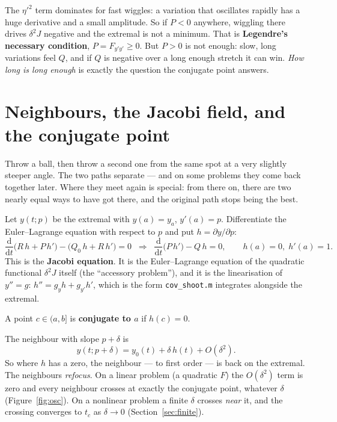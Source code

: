 \documentclass[11pt]{article}
\newcommand{\file}[1]{\texttt{#1}}
\newcommand{\dd}{\mathrm{d}}
\begin{document}
\begin{intu}
The $\eta'^2$ term dominates for fast wiggles: a variation that oscillates
rapidly has a huge derivative and a small amplitude. So if $P < 0$ anywhere,
wiggling there drives $\delta^2 J$ negative and the extremal is not a minimum.
That is \textbf{Legendre's necessary condition}, $P = F_{y'y'} \ge 0$. But
$P > 0$ is not enough: slow, long variations feel $Q$, and if $Q$ is negative
over a long enough stretch it can win. \emph{How long is long enough} is exactly
the question the conjugate point answers.
\end{intu}

\section{Neighbours, the Jacobi field, and the conjugate point}

\begin{eli}
Throw a ball, then throw a second one from the same spot at a very slightly
steeper angle. The two paths separate --- and on some problems they come back
together later. Where they meet again is special: from there on, there are two
nearly equal ways to have got there, and the original path stops being the best.
\end{eli}

\begin{rig}
Let $y(t;p)$ be the extremal with $y(a) = y_a$, $y'(a) = p$. Differentiate the
Euler--Lagrange equation with respect to $p$ and put $h = \partial y/\partial p$:
\[
  \frac{\dd}{\dd t}\big( R\,h + P\,h' \big) - \big( Q_0\,h + R\,h' \big) = 0
  \;\;\Longrightarrow\;\;
  \frac{\dd}{\dd t}\big( P\,h' \big) - Q\,h = 0,
  \qquad h(a) = 0,\; h'(a) = 1 .
\]
This is the \textbf{Jacobi equation}. It is the Euler--Lagrange equation of the
quadratic functional $\delta^2 J$ itself (the ``accessory problem''), and it is the
linearisation of $y'' = g$: $h'' = g_y h + g_{y'} h'$, which is the form
\file{cov\_shoot.m} integrates alongside the extremal.

A point $c \in (a, b]$ is \textbf{conjugate to $a$} if $h(c) = 0$.
\end{rig}

\begin{intu}
The neighbour with slope $p + \delta$ is
\[
  y(t; p + \delta) = y_0(t) + \delta\,h(t) + O(\delta^2).
\]
So where $h$ has a zero, the neighbour --- to first order --- is back on the
extremal. The neighbours \emph{refocus}. On a linear problem (a quadratic $F$) the
$O(\delta^2)$ term is zero and every neighbour crosses at exactly the conjugate
point, whatever $\delta$ (Figure~\ref{fig:osc}). On a nonlinear problem a finite
$\delta$ crosses \emph{near} it, and the crossing converges to $t_c$ as
$\delta \to 0$ (Section~\ref{sec:finite}).
\end{intu}
\end{document}
